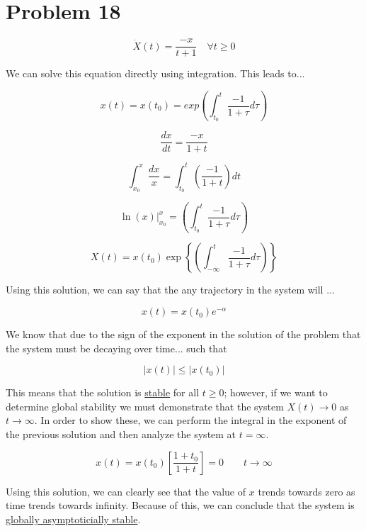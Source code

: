 \section*{Problem 18}



$$
\dot{X}(t) = \frac{-x}{t+1} \quad \forall t \geq 0
$$

\noindent We can solve this equation directly using integration. This leads to...


$$
x(t)  = x(t_0) = exp\left( \int_{t_0}^t \frac{-1}{1 + \tau} d\tau \right)
$$



$$
\frac{dx}{dt} = \frac{-x}{1 + t}
$$



$$
\int_{x_{0}}^{x} \frac{d x}{x}=\int_{t_{0}}^{t}\left(\frac{-1}{1+t}\right) d t
$$



$$
\left.\ln (x)\right|_{x_{0}} ^{x}=\left(\int_{t_{0}}^{t} \frac{-1}{1+\tau} d \tau\right)
$$


$$
X(t)=x\left(t_{0}\right) \exp \left\{\left(\int_{-\infty}^{t} \frac{-1}{1+\tau} d \tau\right)\right\}
$$



\noindent Using this solution, we can say that the any trajectory in the system will ...


$$
x(t) = x(t_0)e^{-\alpha}
$$

\noindent We know that due to the sign of the exponent in the solution of the problem that the system must be decaying over time... such that


$$
|x(t)| \leq |x(t_0)|
$$

\noindent This means that the solution is \underline{stable} for all $t \geq 0$; however, if we want to determine global stability we must demonstrate that the system $X(t) \rightarrow 0$ as $t \rightarrow \infty $. In order to show these, we can perform the integral in the exponent of the previous solution and then analyze the system at $t=\infty$.

$$
x(t) = x(t_0)\left[\frac{1+ t_0}{1 + t} \right] = 0 \quad \quad t \rightarrow \infty
$$


\noindent Using this solution, we can clearly see that the value of $x$ trends towards zero as time trends towards infinity. Because of this, we can conclude that the system is \underline{globally asymptoticially stable}.
